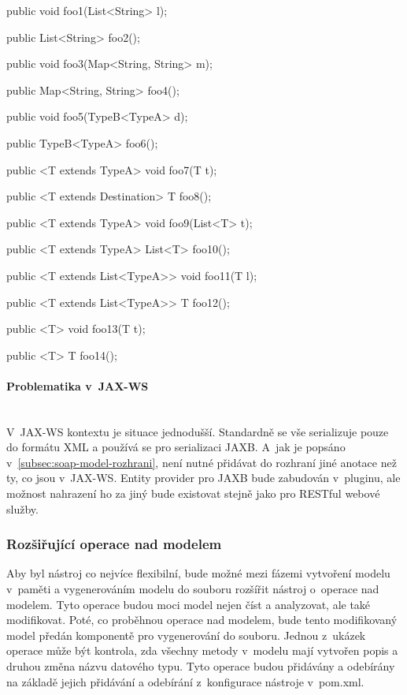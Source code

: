 \documentclass[11pt,twoside,a4paper]{book}
\begin{document}
\begin{code}[frame=single, caption={Příklad podporovaných signatur
resource metod}, label={lst:signatury-metod}]
public void foo1(List<String> l);

public List<String> foo2();

public void foo3(Map<String, String> m);

public Map<String, String> foo4();

public void foo5(TypeB<TypeA> d);

public TypeB<TypeA> foo6();

public <T extends TypeA> void foo7(T t);

public <T extends Destination> T foo8();

public <T extends TypeA> void foo9(List<T> t);

public <T extends TypeA> List<T> foo10();

public <T extends List<TypeA>> void foo11(T l);

public <T extends List<TypeA>> T foo12();

public <T> void foo13(T t);

public <T> T foo14();
\end{code}

\paragraph{Problematika v~JAX-WS}
\mbox{}\\

V~JAX-WS kontextu je situace jednodušší. Standardně se vše serializuje pouze do
formátu XML a používá se pro serializaci JAXB. A~jak je popsáno
v~\ref{subsec:soap-model-rozhrani}, není nutné přidávat do rozhraní jiné anotace
než ty, co jsou v~JAX-WS. Entity provider pro JAXB bude zabudován v~pluginu, ale
možnost nahrazení ho za jiný bude existovat stejně jako pro RESTful webové
služby.

\subsubsection{Rozšiřující operace nad modelem}
\label{subsec:rozsirujici-operace-nad-modelem}

Aby byl nástroj co nejvíce flexibilní, bude možné mezi fázemi vytvoření modelu
v~paměti a vygenerováním modelu do souboru rozšířit nástroj o~operace nad modelem.
Tyto operace budou moci model nejen číst a analyzovat, ale také modifikovat.
Poté, co proběhnou operace nad modelem, bude tento modifikovaný model předán
komponentě pro vygenerování do souboru.
Jednou z~ukázek operace může být kontrola, zda všechny metody v~modelu mají
vytvořen popis a druhou změna názvu datového typu. Tyto operace budou přidávány
a odebírány na základě jejich přidávání a odebírání z~konfigurace nástroje
v~pom.xml.
\end{document}

